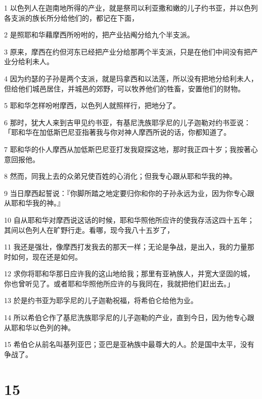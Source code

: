 \par 1 以色列人在迦南地所得的产业，就是祭司以利亚撒和嫩的儿子约书亚，并以色列各支派的族长所分给他们的，都记在下面，
\par 2 是照耶和华藉摩西所吩咐的，把产业拈阄分给九个半支派。
\par 3 原来，摩西在约但河东已经把产业分给那两个半支派，只是在他们中间没有把产业分给利未人。
\par 4 因为约瑟的子孙是两个支派，就是玛拿西和以法莲，所以没有把地分给利未人，但给他们城邑居住，并城邑的郊野，可以牧养他们的牲畜，安置他们的财物。
\par 5 耶和华怎样吩咐摩西，以色列人就照样行，把地分了。
\par 6 那时，犹大人来到吉甲见约书亚，有基尼洗族耶孚尼的儿子迦勒对约书亚说：「耶和华在加低斯巴尼亚指著我与你对神人摩西所说的话，你都知道了。
\par 7 耶和华的仆人摩西从加低斯巴尼亚打发我窥探这地，那时我正四十岁；我按著心意回报他。
\par 8 然而，同我上去的众弟兄使百姓的心消化；但我专心跟从耶和华我的神。
\par 9 当日摩西起誓说：『你脚所踏之地定要归你和你的子孙永远为业，因为你专心跟从耶和华我的神。』
\par 10 自从耶和华对摩西说这话的时候，耶和华照他所应许的使我存活这四十五年；其间以色列人在旷野行走。看哪，现今我八十五岁了，
\par 11 我还是强壮，像摩西打发我去的那天一样；无论是争战，是出入，我的力量那时如何，现在还是如何。
\par 12 求你将耶和华那日应许我的这山地给我；那里有亚衲族人，并宽大坚固的城，你也曾听见了。或者耶和华照他所应许的与我同在，我就把他们赶出去。」
\par 13 於是约书亚为耶孚尼的儿子迦勒祝福，将希伯仑给他为业。
\par 14 所以希伯仑作了基尼洗族耶孚尼的儿子迦勒的产业，直到今日，因为他专心跟从耶和华以色列的神。
\par 15 希伯仑从前名叫基列亚巴；亚巴是亚衲族中最尊大的人。於是国中太平，没有争战了。

\chapter{15}

